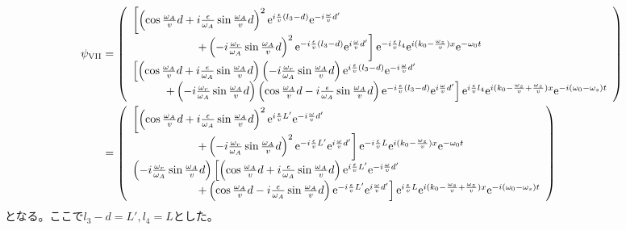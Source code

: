 \begin{align}
\psi_\mathrm{VII} &= \left( \begin{array}{l} \left[\left(\cos \frac{\omega_A}{v}d +i\frac{\epsilon}{\omega_A} \sin \frac{\omega_A}{v}d\right)^2\mathrm{e}^{i\frac{\epsilon}{v}(l_3-d)}\mathrm{e}^{-i\frac{\omega}{v}d'} \right. \\ \hspace{2cm}\left. +\left(-i \frac{\omega_r}{\omega_A} \sin \frac{\omega_A}{v}d\right)^2\mathrm{e}^{-i\frac{\epsilon}{v}(l_3-d)}\mathrm{e}^{i\frac{\omega}{v}d'} \right]\mathrm{e}^{-i\frac{\epsilon}{v}l_4}\mathrm{e}^{i(k_0-\frac{\omega_z}{v})x} \mathrm{e}^{-\omega_0t} \\ \left[\left(\cos \frac{\omega_A}{v}d +i\frac{\epsilon}{\omega_A} \sin \frac{\omega_A}{v}d\right) \left(-i \frac{\omega_r}{\omega_A} \sin \frac{\omega_A}{v}d\right) \mathrm{e}^{i\frac{\epsilon}{v}(l_3-d)}\mathrm{e}^{-i\frac{\omega}{v}d'} \right. \\ \hspace{1cm} \left. +\left(-i \frac{\omega_r}{\omega_A} \sin \frac{\omega_A}{v}d\right) \left(\cos \frac{\omega_A}{v}d -i\frac{\epsilon}{\omega_A} \sin \frac{\omega_A}{v}d\right) \mathrm{e}^{-i\frac{\epsilon}{v}(l_3-d)}\mathrm{e}^{i\frac{\omega}{v}d'} \right] \mathrm{e}^{i\frac{\epsilon}{v}l_4} \mathrm{e}^{i(k_0-\frac{\omega_s}{v}+\frac{\omega_z}{v})x} \mathrm{e}^{-i(\omega_0-\omega_s) t} \end{array}\right) \notag \\
&=\left( \begin{array}{l} \left[\left(\cos \frac{\omega_A}{v}d +i\frac{\epsilon}{\omega_A} \sin \frac{\omega_A}{v}d\right)^2\mathrm{e}^{i\frac{\epsilon}{v}L'}\mathrm{e}^{-i\frac{\omega}{v}d'} \right. \\ \hspace{2cm}\left. +\left(-i \frac{\omega_r}{\omega_A} \sin \frac{\omega_A}{v}d\right)^2\mathrm{e}^{-i\frac{\epsilon}{v}L'}\mathrm{e}^{i\frac{\omega}{v}d'} \right]\mathrm{e}^{-i\frac{\epsilon}{v}L}\mathrm{e}^{i(k_0-\frac{\omega_z}{v})x} \mathrm{e}^{-\omega_0t} \\ \left(-i \frac{\omega_r}{\omega_A} \sin \frac{\omega_A}{v}d\right) \left[\left(\cos \frac{\omega_A}{v}d +i\frac{\epsilon}{\omega_A} \sin \frac{\omega_A}{v}d\right) \mathrm{e}^{i\frac{\epsilon}{v}L'}\mathrm{e}^{-i\frac{\omega}{v}d'} \right. \\ \hspace{2cm} \left. +\left(\cos \frac{\omega_A}{v}d -i\frac{\epsilon}{\omega_A} \sin \frac{\omega_A}{v}d\right) \mathrm{e}^{-i\frac{\epsilon}{v}L'}\mathrm{e}^{i\frac{\omega}{v}d'} \right] \mathrm{e}^{i\frac{\epsilon}{v}L} \mathrm{e}^{i(k_0-\frac{\omega_s}{v}+\frac{\omega_z}{v})x} \mathrm{e}^{-i(\omega_0-\omega_s) t} \end{array}\right)
\end{align}
となる。ここで$l_3-d=L',l_4=L$とした。


